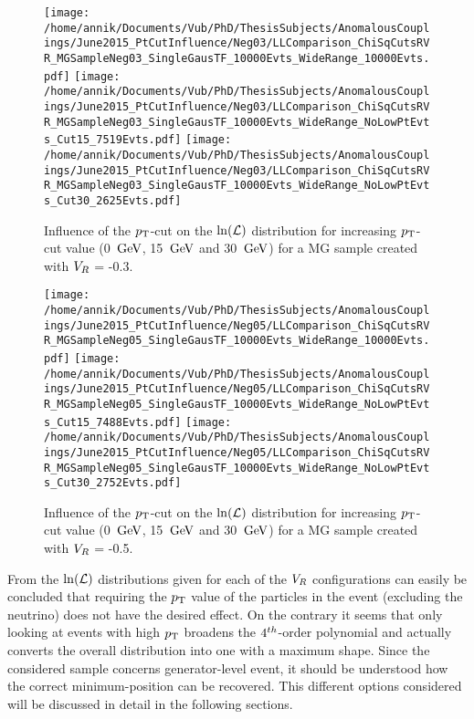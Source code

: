 \begin{figure}[h!t]
 \centering
 \texttt{[image: /home/annik/Documents/Vub/PhD/ThesisSubjects/AnomalousCouplings/June2015\_PtCutInfluence/Neg03/LLComparison\_ChiSqCutsRVR\_MGSampleNeg03\_SingleGausTF\_10000Evts\_WideRange\_10000Evts.pdf]}
 \texttt{[image: /home/annik/Documents/Vub/PhD/ThesisSubjects/AnomalousCouplings/June2015\_PtCutInfluence/Neg03/LLComparison\_ChiSqCutsRVR\_MGSampleNeg03\_SingleGausTF\_10000Evts\_WideRange\_NoLowPtEvts\_Cut15\_7519Evts.pdf]}
 \texttt{[image: /home/annik/Documents/Vub/PhD/ThesisSubjects/AnomalousCouplings/June2015\_PtCutInfluence/Neg03/LLComparison\_ChiSqCutsRVR\_MGSampleNeg03\_SingleGausTF\_10000Evts\_WideRange\_NoLowPtEvts\_Cut30\_2625Evts.pdf]}
 \caption{Influence of the $p_{\textrm T}$-cut on the $\ln(\mathcal{L})$ distribution for increasing $p_{\textrm T}$-cut value (0 $\, \mathrm{GeV}$, 15 $\, \mathrm{GeV}$ and 30 $\, \mathrm{GeV}$) for a MG sample created with $V_{R}$ = -0.3.}
 \label{fig::PtCutInflNeg03}
\end{figure}

\begin{figure}[h!t]
 \centering
 \texttt{[image: /home/annik/Documents/Vub/PhD/ThesisSubjects/AnomalousCouplings/June2015\_PtCutInfluence/Neg05/LLComparison\_ChiSqCutsRVR\_MGSampleNeg05\_SingleGausTF\_10000Evts\_WideRange\_10000Evts.pdf]}
 \texttt{[image: /home/annik/Documents/Vub/PhD/ThesisSubjects/AnomalousCouplings/June2015\_PtCutInfluence/Neg05/LLComparison\_ChiSqCutsRVR\_MGSampleNeg05\_SingleGausTF\_10000Evts\_WideRange\_NoLowPtEvts\_Cut15\_7488Evts.pdf]}
 \texttt{[image: /home/annik/Documents/Vub/PhD/ThesisSubjects/AnomalousCouplings/June2015\_PtCutInfluence/Neg05/LLComparison\_ChiSqCutsRVR\_MGSampleNeg05\_SingleGausTF\_10000Evts\_WideRange\_NoLowPtEvts\_Cut30\_2752Evts.pdf]}
 \caption{Influence of the $p_{\textrm T}$-cut on the $\ln(\mathcal{L})$ distribution for increasing $p_{\textrm T}$-cut value (0 $\, \mathrm{GeV}$, 15 $\, \mathrm{GeV}$ and 30 $\, \mathrm{GeV}$) for a MG sample created with $V_{R}$ = -0.5.}
 \label{fig::PtCutInflNeg05}
\end{figure}

From the $\ln(\mathcal{L})$ distributions given for each of the $V_{R}$ configurations can easily be concluded that requiring the $p_{\textrm T}$ value of the particles in the event (excluding the neutrino) does not have the desired effect. On the contrary it seems that only looking at events with high $p_{\textrm T}$ broadens the $4^{th}$-order polynomial and actually converts the overall distribution into one with a maximum shape. Since the considered sample concerns generator-level event, it should be understood how the correct minimum-position can be recovered. This different options considered will be discussed in detail in the following sections.

